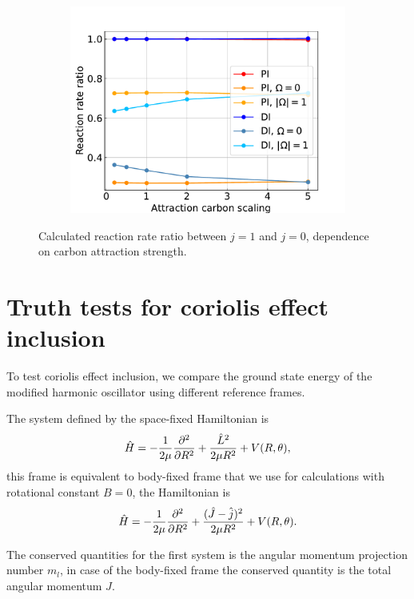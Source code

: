 \documentclass{article}
\begin{document}
    \begin{figure}[H]
        \centering
        \begin{subfigure}{.7\linewidth}
            \centering
            \includegraphics[width=\linewidth]{attr_c_scaling_ff_ratio.pdf}
        \end{subfigure} 
        \caption{Calculated reaction rate ratio between $j = 1$ and $j = 0$, dependence on carbon attraction strength.}
    \end{figure}


\section{Truth tests for coriolis effect inclusion}
    To test coriolis effect inclusion, we compare the ground state energy 
    of the modified harmonic oscillator using different reference frames.

    The system defined by the space-fixed Hamiltonian is
    \begin{equation}
        \hat{H} = -\frac{1}{2\mu} \pdv*[order=2]{}{R} + \frac{\hat{L}^2}{2 \mu R^2} + V(R, \theta),
    \end{equation}
    this frame is equivalent to body-fixed frame that we use for calculations with rotational constant $B = 0$,
    the Hamiltonian is
    \begin{equation}
        \hat{H} = -\frac{1}{2\mu} \pdv*[order=2]{}{R} + \frac{(\hat{J} - \hat{j})^2}{2 \mu R^2} + V(R, \theta).
    \end{equation}

    The conserved quantities for the first system is the angular momentum projection number $m_l$,
    in case of the body-fixed frame the conserved quantity is the total angular momentum $J$.
\end{document}
